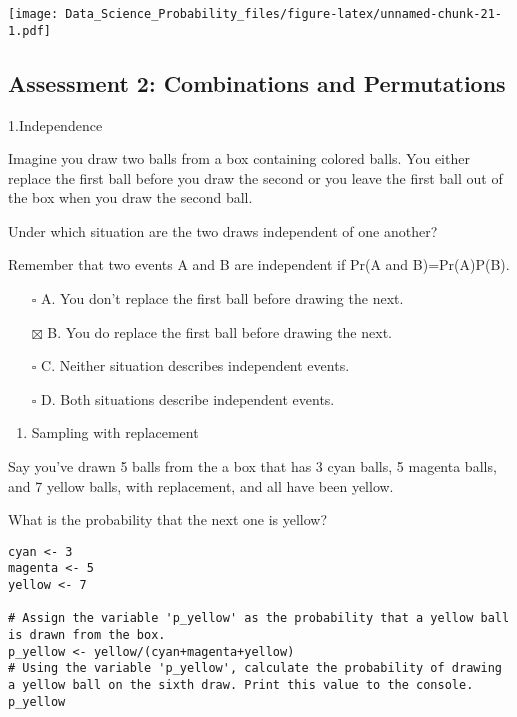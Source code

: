 \documentclass[
]{article}
\providecommand{\tightlist}{%
  \setlength{\itemsep}{0pt}\setlength{\parskip}{0pt}}
\begin{document}
\texttt{[image: Data\_Science\_Probability\_files/figure-latex/unnamed-chunk-21-1.pdf]}

\hypertarget{assessment-2-combinations-and-permutations}{%
\subsection{Assessment 2: Combinations and
Permutations}\label{assessment-2-combinations-and-permutations}}

1.Independence

Imagine you draw two balls from a box containing colored balls. You
either replace the first ball before you draw the second or you leave
the first ball out of the box when you draw the second ball.

Under which situation are the two draws independent of one another?

Remember that two events A and B are independent if Pr(A and
B)=Pr(A)P(B).

\begin{itemize}
\tightlist
\item[$\square$]
  A. You don't replace the first ball before drawing the next.
\item[$\boxtimes$]
  B. You do replace the first ball before drawing the next.
\item[$\square$]
  C. Neither situation describes independent events.
\item[$\square$]
  D. Both situations describe independent events.
\end{itemize}

\begin{enumerate}
\def\labelenumi{\arabic{enumi}.}
\setcounter{enumi}{1}
\tightlist
\item
  Sampling with replacement
\end{enumerate}

Say you've drawn 5 balls from the a box that has 3 cyan balls, 5 magenta
balls, and 7 yellow balls, with replacement, and all have been yellow.

What is the probability that the next one is yellow?

\begin{verbatim}
cyan <- 3
magenta <- 5
yellow <- 7

# Assign the variable 'p_yellow' as the probability that a yellow ball is drawn from the box.
p_yellow <- yellow/(cyan+magenta+yellow)
# Using the variable 'p_yellow', calculate the probability of drawing a yellow ball on the sixth draw. Print this value to the console.
p_yellow
\end{verbatim}
\end{document}
